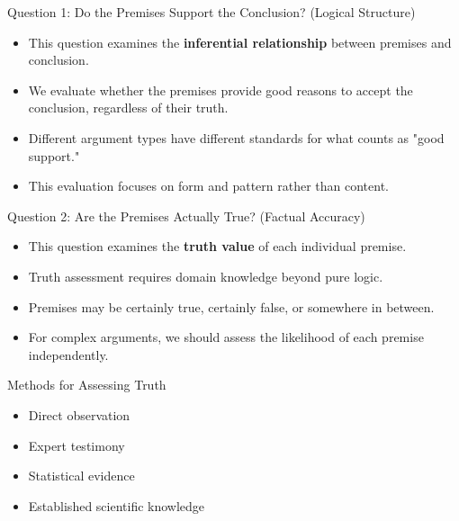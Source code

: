 \documentclass{beamer}
\begin{document}
\begin{frame}{Question 1: Do the Premises Support the Conclusion? (Logical Structure)}
    \begin{itemize}
        \item This question examines the \textbf{inferential relationship} between premises and conclusion.
        \item We evaluate whether the premises provide good reasons to accept the conclusion, regardless of their truth.
        \item Different argument types have different standards for what counts as "good support."
        \item This evaluation focuses on form and pattern rather than content.
    \end{itemize}
    
\end{frame}

\begin{frame}{Question 2: Are the Premises Actually True? (Factual Accuracy)}
    \begin{itemize}
        \item This question examines the \textbf{truth value} of each individual premise.
        \item Truth assessment requires domain knowledge beyond pure logic.
        \item Premises may be certainly true, certainly false, or somewhere in between.
        \item For complex arguments, we should assess the likelihood of each premise independently.
    \end{itemize}
    
    \begin{exampleblock}{Methods for Assessing Truth}
        \begin{itemize}
            \item Direct observation
            \item Expert testimony
            \item Statistical evidence
            \item Established scientific knowledge
        \end{itemize}
    \end{exampleblock}
\end{frame}
\end{document}
